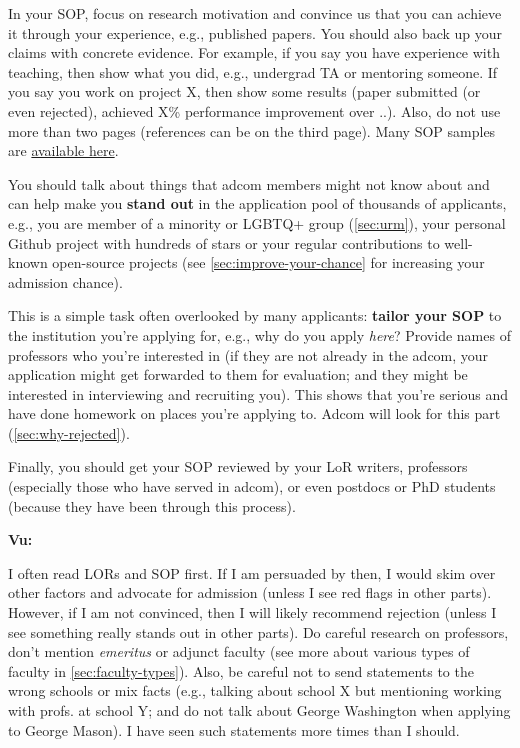 \documentclass[oneside,11pt,dvipsnames]{book}
\newenvironment{commentbox}[1][]{
  \small
  \begin{mybox}
    {\small \textbf{#1}}
  }{
  \end{mybox}
}
\begin{document}
In your SOP, focus on research motivation and convince us that you can achieve it through your experience, e.g., published papers. You should also back up your claims with concrete evidence. For example, if you say you have experience with teaching, then show what you did, e.g., undergrad TA or mentoring someone.  If you say you work on project X, then show some results (paper submitted (or even rejected), achieved X\% performance improvement over ..). Also, do not use more than two pages (references can be on the third page). Many SOP samples are \href{https://cs-sop.org/}{available here}.

You should talk about things that adcom members might not know about and can help make you \textbf{stand out} in the application pool of thousands of applicants, e.g., you are member of a minority or LGBTQ+ group (\autoref{sec:urm}), your personal Github project with hundreds of stars or your regular contributions to well-known open-source projects (see \autoref{sec:improve-your-chance} for increasing your admission chance).


This is a simple task often overlooked by many applicants: \textbf{tailor your SOP} to the institution you're applying for,
e.g., why do you apply \emph{here}? Provide names of professors who you're interested in (if they are not already in the adcom, your application might get forwarded to them for evaluation; and they might be interested in interviewing and recruiting you).
This shows that you're serious and have done homework on places you're applying to.
Adcom will look for this part (\autoref{sec:why-rejected}).

Finally, you should get your SOP reviewed by your LoR writers, professors (especially those who have served in adcom), or even postdocs or PhD students (because they have been through this process).

\begin{commentbox}[Vu:]
  I often read LORs and SOP first. If I am
  persuaded by then, I would skim over other factors and advocate for
  admission (unless I see red flags in other parts). However, if I am not
  convinced, then I will likely recommend rejection (unless I see
  something really stands out in other parts).
  \tcblower
  Do careful research on professors, don't mention \emph{emeritus} or adjunct faculty (see more about various types of faculty in \autoref{sec:faculty-types}).
  Also, be careful not to send statements to the wrong schools or mix
  facts (e.g., talking about school X but mentioning working with
  profs. at school Y; and do not talk about George Washington when applying to George Mason). I have seen such statements more times than I should.
\end{commentbox}
\end{document}
